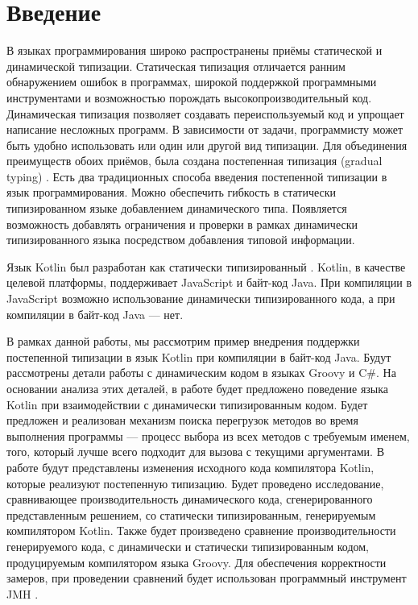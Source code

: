 \section*{Введение}

В языках программирования широко распространены приёмы статической и динамической типизации. Статическая типизация отличается ранним обнаружением ошибок в программах, широкой поддержкой программными инструментами и возможностью порождать высокопроизводительный код. Динамическая типизация позволяет создавать переиспользуемый код и упрощает написание несложных программ. 
В зависимости от задачи, программисту может быть удобно использовать или один или другой вид типизации. Для объединения преимуществ обоих приёмов, была создана постепенная типизация (gradual typing) \cite{gradual:siek2006gradual}. Есть два традиционных способа введения постепенной типизации в язык программирования. Можно обеспечить гибкость в статически типизированном языке добавлением динамического типа. Появляется возможность добавлять ограничения и проверки в рамках динамически типизированного языка посредством добавления типовой информации.

Язык Kotlin был разработан как статически типизированный . 
Kotlin, в качестве целевой платформы, поддерживает JavaScript и байт-код Java. При компиляции в JavaScript возможно использование динамически типизированного кода, а при компиляции в байт-код Java --- нет.

В рамках данной работы, мы рассмотрим пример внедрения поддержки постепенной типизации в язык Kotlin при компиляции в байт-код Java. Будут рассмотрены детали работы с динамическим кодом в языках Groovy и C\#. На основании анализа этих деталей, в работе будет предложено поведение языка Kotlin при взаимодействии с динамически типизированным кодом. Будет предложен и реализован механизм поиска перегрузок методов во время выполнения программы --- процесс выбора из всех методов с требуемым именем, того, который лучше всего подходит для вызова с текущими аргументами. В работе будут представлены изменения исходного кода компилятора Kotlin, которые реализуют постепенную типизацию. Будет проведено исследование, сравнивающее производительность динамического кода, сгенерированного представленным решением, со статически типизированным, генерируемым компилятором Kotlin. Также будет произведено сравнение производительности генерируемого кода, с динамически и статически типизированным кодом, продуцируемым компилятором языка Groovy. Для обеспечения корректности замеров, при проведении сравнений будет использован программный инструмент JMH \cite{java:jmh}.



